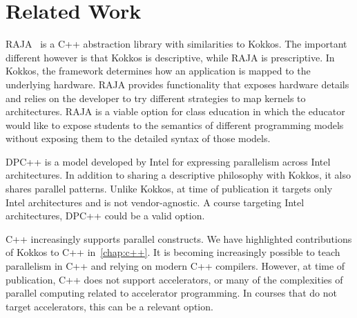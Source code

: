\section{Related Work}\label{chap:related}
RAJA~\cite{RAJA} is a C++ abstraction library with similarities to Kokkos. The important different however is that Kokkos is descriptive, while RAJA is prescriptive. In Kokkos, the framework determines how an application is mapped to the underlying hardware. RAJA provides functionality that exposes hardware details and relies on the developer to try different strategies to map kernels to architectures. RAJA is a viable option for class education in which the educator would like to expose students to the semantics of different programming models without exposing them to the detailed syntax of those models.

DPC++\cite{DPCPP} is a model developed by Intel\textsuperscript{\textregistered} for expressing parallelism across Intel architectures. In addition to sharing a descriptive philosophy with Kokkos, it also shares parallel patterns. Unlike Kokkos, at time of publication it targets only Intel architectures and is not vendor-agnostic. A course targeting Intel architectures, DPC++ could be a valid option.

C++ increasingly supports parallel constructs. We have highlighted contributions of Kokkos to C++ in~\ref{chap:c++}. It is becoming increasingly possible to teach parallelism in C++ and relying on modern C++ compilers. However, at time of publication, C++ does not support accelerators, or many of the complexities of parallel computing related to accelerator programming. In courses that do not target accelerators, this can be a relevant option.
 

